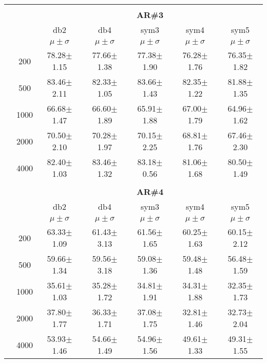 \begin{table}[H]
\begin{tabular}{|c|c|c c c c c|}
\\ \midrule
\multicolumn{7}{c}{}\\ 



\cline{3-7}
\multicolumn{2}{c|}{\multirow{3}{*}{}} & \multicolumn{5}{c|}{\textbf{AR\#3}}   \\\cline{3-7} 

\multicolumn{2}{c|}{}  & db2 & db4 & sym3 & sym4 & sym5 \\\cline{3-7}
\multicolumn{2}{c|}{}& $\mu \pm \sigma$ & $\mu \pm \sigma$ & $\mu \pm \sigma$ & $\mu \pm \sigma$ & $\mu \pm \sigma$ \\\hline

\multicolumn{1}{|c|}{ \multirow{5}{*}{\rotatebox[origin=c]{90}{\textbf{Neurônios}}} }
&200	&78.28$\pm$1.15	&77.66$\pm$1.38	&77.38$\pm$1.90	&76.28$\pm$1.76	&76.35$\pm$1.82	\\\cline{2-7}
&500	&83.46$\pm$2.11	&82.33$\pm$1.05	&83.66$\pm$1.43	&82.35$\pm$1.22	&81.88$\pm$1.35	\\\cline{2-7}
&1000	&66.68$\pm$1.47	&66.60$\pm$1.89	&65.91$\pm$1.88	&67.00$\pm$1.79	&64.96$\pm$1.62	\\\cline{2-7}
&2000	&70.50$\pm$2.10	&70.28$\pm$1.97	&70.15$\pm$2.25	&68.81$\pm$1.76	&67.46$\pm$2.30	\\\cline{2-7}
&4000	&82.40$\pm$1.03	&83.46$\pm$1.32	&83.18$\pm$0.56	&81.06$\pm$1.68	&80.50$\pm$1.49	


\\\midrule 
\multicolumn{7}{c}{}\\ 



\cline{3-7}
\multicolumn{2}{c|}{\multirow{3}{*}{}} & \multicolumn{5}{c|}{\textbf{AR\#4}}   \\\cline{3-7} 

\multicolumn{2}{c|}{}  & db2 & db4 & sym3 & sym4 & sym5 \\\cline{3-7}
\multicolumn{2}{c|}{}& $\mu \pm \sigma$ & $\mu \pm \sigma$ & $\mu \pm \sigma$ & $\mu \pm \sigma$ & $\mu \pm \sigma$ \\\hline

\multicolumn{1}{|c|}{ \multirow{5}{*}{\rotatebox[origin=c]{90}{\textbf{Neurônios}}} }
&200	&63.33$\pm$1.09	&61.43$\pm$3.13	&61.56$\pm$1.65	&60.25$\pm$1.63	&60.15$\pm$2.12	\\\cline{2-7}
&500	&59.66$\pm$1.34	&59.56$\pm$3.18	&59.08$\pm$1.36	&59.48$\pm$1.48	&56.48$\pm$1.59	\\\cline{2-7}
&1000	&35.61$\pm$1.03	&35.28$\pm$1.72	&34.81$\pm$1.91	&34.31$\pm$1.88	&32.35$\pm$1.73	\\\cline{2-7}
&2000	&37.80$\pm$1.77	&36.33$\pm$1.71	&37.08$\pm$1.75	&32.81$\pm$1.46	&32.73$\pm$2.04	\\\cline{2-7}
&4000	&53.93$\pm$1.46	&54.66$\pm$1.49	&54.96$\pm$1.56	&49.61$\pm$1.33	&49.31$\pm$1.55	

\\\midrule
	\end{tabular}

\end{table}
